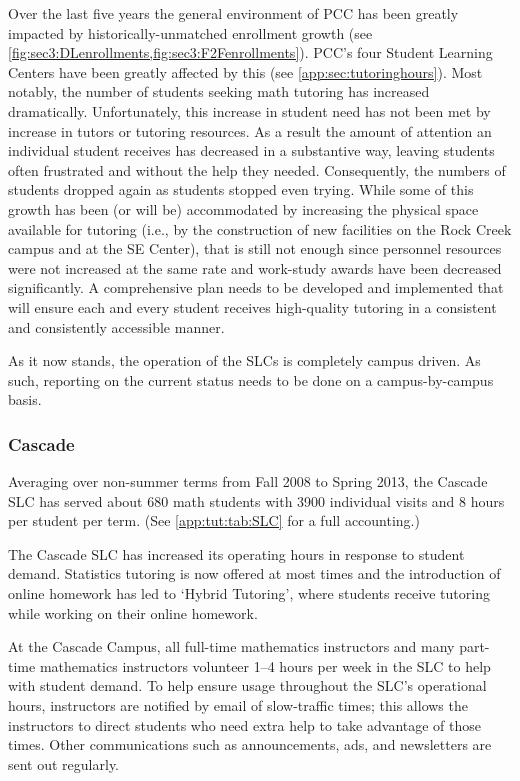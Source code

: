 Over the last five years the general environment of PCC has been greatly
impacted by historically-unmatched enrollment growth (see \vref{fig:sec3:DLenrollments,fig:sec3:F2Fenrollments}). PCC's four Student
Learning Centers have been greatly affected by this (see \vref{app:sec:tutoringhours}).  
Most notably, the number of students seeking math tutoring has
increased dramatically.  Unfortunately, this increase in student need has not
been met by increase in tutors or tutoring resources.  As a result the
amount of attention an individual student receives has decreased in a
substantive way, leaving students often frustrated and without the help they needed. Consequently, the numbers of students dropped again as students stopped even trying.   While some of this growth has been (or will be) accommodated
by increasing the physical space available for tutoring (i.e., by the
construction of new facilities on the Rock Creek campus and at the SE Center),
that is still not enough since personnel resources were not increased at the same rate and work-study awards have been decreased significantly.  A comprehensive plan needs to be developed and implemented that will ensure each and every student receives high-quality tutoring in a consistent and consistently accessible manner.

As it now stands, the operation of the SLCs is completely campus driven.  As
such, reporting on the current status needs to be done on a campus-by-campus
basis.

\subsubsection{Cascade}
Averaging over non-summer terms from Fall 2008 to Spring 2013, the Cascade SLC has served about 
680 math students with 3900 individual visits and 8 hours per student per term. (See \vref{app:tut:tab:SLC} for a full accounting.) 

The Cascade SLC has increased its operating hours in response to student
demand. Statistics tutoring is now offered at most times and the introduction of
online homework has led to `Hybrid Tutoring', where students receive tutoring
while working on their online homework. 

At the Cascade Campus, all full-time mathematics instructors and many part-time
mathematics instructors volunteer 1--4 hours per week in the SLC to help with
student demand. To help ensure usage throughout the SLC's operational hours,
instructors are notified by email of slow-traffic times; this allows the
instructors to direct students who need extra help to take advantage of those
times. Other communications such as announcements, ads, and newsletters are
sent out regularly.


